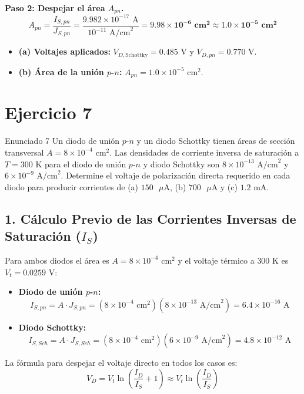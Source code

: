 \documentclass[11pt,a4paper]{article}
\begin{document}
\textbf{Paso 2: Despejar el área $A_{pn}$.}
\[
A_{pn} = \frac{I_{S,pn}}{J_{S,pn}} = \frac{9.982 \times 10^{-17}\text{ A}}{10^{-11}\text{ A/cm}^2} = \mathbf{9.98 \times 10^{-6}\text{ cm}^2 \approx 1.0 \times 10^{-5}\text{ cm}^2}
\]

\begin{respuestabox}
\begin{itemize}
    \item \textbf{(a) Voltajes aplicados:} $V_{D,\text{Schottky}} = 0.485\text{ V}$ y $V_{D,pn} = 0.770\text{ V}$.
    \item \textbf{(b) Área de la unión $p$-$n$:} $A_{pn} = 1.0 \times 10^{-5}\text{ cm}^2$.
\end{itemize}
\end{respuestabox}

\newpage

\section*{Ejercicio 7}
\begin{ejerciciobox}{Enunciado 7}
Un diodo de unión $p$-$n$ y un diodo Schottky tienen áreas de sección transversal $A = 8 \times 10^{-4}\text{ cm}^2$. Las densidades de corriente inversa de saturación a $T = 300\text{ K}$ para el diodo de unión $p$-$n$ y diodo Schottky son $8 \times 10^{-13}\text{ A/cm}^2$ y $6 \times 10^{-9}\text{ A/cm}^2$. Determine el voltaje de polarización directa requerido en cada diodo para producir corrientes de (a) $150\text{ }\mu\text{A}$, (b) $700\text{ }\mu\text{A}$ y (c) $1.2\text{ mA}$.
\end{ejerciciobox}

\subsection*{1. Cálculo Previo de las Corrientes Inversas de Saturación ($I_S$)}
Para ambos diodos el área es $A = 8 \times 10^{-4}\text{ cm}^2$ y el voltaje térmico a $300\text{ K}$ es $V_t = 0.0259\text{ V}$:
\begin{itemize}
    \item \textbf{Diodo de unión $p$-$n$:}
    \[
    I_{S,pn} = A \cdot J_{S,pn} = (8 \times 10^{-4}\text{ cm}^2)(8 \times 10^{-13}\text{ A/cm}^2) = 6.4 \times 10^{-16}\text{ A}
    \]
    \item \textbf{Diodo Schottky:}
    \[
    I_{S,Sch} = A \cdot J_{S,Sch} = (8 \times 10^{-4}\text{ cm}^2)(6 \times 10^{-9}\text{ A/cm}^2) = 4.8 \times 10^{-12}\text{ A}
    \]
\end{itemize}
La fórmula para despejar el voltaje directo en todos los casos es:
\[
V_D = V_t \ln\left(\frac{I_D}{I_S} + 1\right) \approx V_t \ln\left(\frac{I_D}{I_S}\right)
\]
\end{document}

